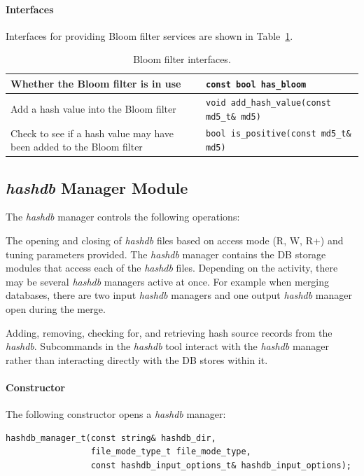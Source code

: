 \documentclass[12pt,twoside]{article}
\newcommand{\hdb}{\emph{hashdb}\xspace}
\begin{document}
\paragraph{Interfaces}
Interfaces for providing Bloom filter services
are shown in Table~\ref{bloom-filter-interfaces}.
\begin{table}[h]
\center
\begin{tabular}{|p{2in}|p{4in}|}
\hline
Whether the Bloom filter is in use &\texttt{const bool has\_bloom} \\
\hline
Add a hash value into the Bloom filter & \texttt{void add\_hash\_value(const md5\_t\& md5)} \\
\hline
Check to see if a hash value may have been added to the Bloom filter & \texttt{bool is\_positive(const md5\_t\& md5)} \\
\hline
\end{tabular}
\caption{Bloom filter interfaces.\label{bloom-filter-interfaces}}
\end{table}

\subsection{\hdb Manager Module\label{hashdb-manager}}
The \hdb manager controls the following operations:
\begin{compactitem}
\item The opening and closing of \hdb files
based on access mode (R, W, R+) and tuning parameters provided.
The \hdb manager contains the DB storage modules that access each of the \hdb files.
Depending on the activity, there may be several \hdb managers active at once.
For example when merging databases, there are two input \hdb managers
and one output \hdb manager open during the merge.
\item Adding, removing, checking for,
and retrieving hash source records from the \hdb.
Subcommands in the \hdb tool interact with the \hdb manager
rather than interacting directly with the DB stores within it.

\end{compactitem}
\paragraph{Constructor}
The following constructor opens a \hdb manager:
\begin{small}
\begin{verbatim}
hashdb_manager_t(const string& hashdb_dir,
                 file_mode_type_t file_mode_type,
                 const hashdb_input_options_t& hashdb_input_options);
\end{verbatim}
\end{small}
\end{document}
